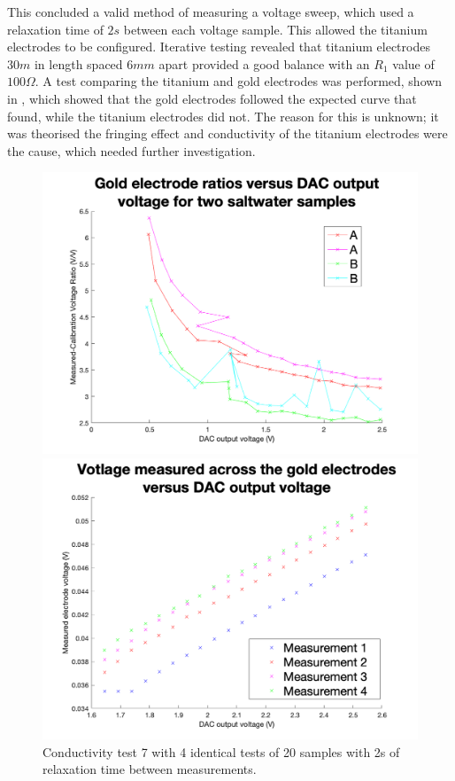 This concluded a valid method of measuring a voltage sweep, which used a relaxation time of $2s$ between each voltage sample.
This allowed the titanium electrodes to be configured.
Iterative testing revealed that titanium electrodes $30m$ in length spaced $6mm$ apart provided a good balance with an $R_1$ value of $100\Omega$.
A test comparing the titanium and gold electrodes was performed, shown in , which showed that the gold electrodes followed the expected curve that  found, while the titanium electrodes did not.
The reason for this is unknown; it was theorised the fringing effect and conductivity of the titanium electrodes were the cause, which needed further investigation.

\begin{figure}[ht]
    \begin{minipage}{0.5\textwidth}
        \centering
        \includegraphics[width=\textwidth]{Figures/Testing/Aus12}
        \caption{Conductivity test 7 with 4 identical tests of 20 samples with 2s of relaxation time between measurements.}
        \label{fig:test7} %
    \end{minipage}
    \begin{minipage}{0.5\textwidth}
        \centering
        \includegraphics[width=\textwidth]{Figures/Testing/Aus10}

\end{minipage}
\end{figure}
